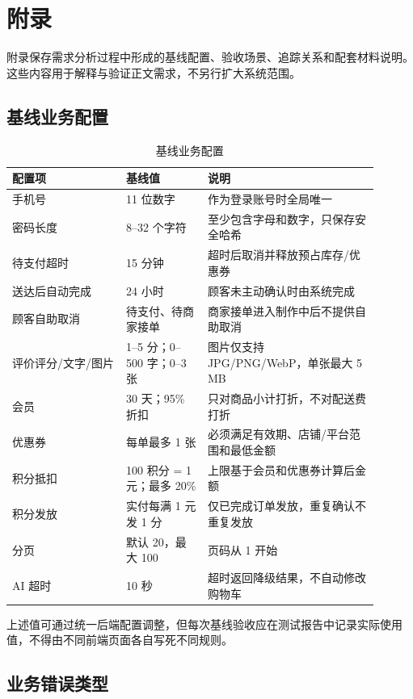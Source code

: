 \section{附录}

附录保存需求分析过程中形成的基线配置、验收场景、追踪关系和配套材料说明。这些内容用于解释与验证正文需求，不另行扩大系统范围。

\subsection{基线业务配置}

\begin{longtable}{|L{0.28\linewidth}|L{0.20\linewidth}|L{0.42\linewidth}|}
\caption{基线业务配置}\label{tab:baseline-config}\\ \hline
\textbf{配置项} & \textbf{基线值} & \textbf{说明} \\ \hline
手机号 & 11 位数字 & 作为登录账号时全局唯一 \\ \hline
密码长度 & 8--32 个字符 & 至少包含字母和数字，只保存安全哈希 \\ \hline
待支付超时 & 15 分钟 & 超时后取消并释放预占库存/优惠券 \\ \hline
送达后自动完成 & 24 小时 & 顾客未主动确认时由系统完成 \\ \hline
顾客自助取消 & 待支付、待商家接单 & 商家接单进入制作中后不提供自助取消 \\ \hline
评价评分/文字/图片 & 1--5 分；0--500 字；0--3 张 & 图片仅支持 JPG/PNG/WebP，单张最大 5 MB \\ \hline
会员 & 30 天；95\% 折扣 & 只对商品小计打折，不对配送费打折 \\ \hline
优惠券 & 每单最多 1 张 & 必须满足有效期、店铺/平台范围和最低金额 \\ \hline
积分抵扣 & 100 积分 = 1 元；最多 20\% & 上限基于会员和优惠券计算后金额 \\ \hline
积分发放 & 实付每满 1 元发 1 分 & 仅已完成订单发放，重复确认不重复发放 \\ \hline
分页 & 默认 20，最大 100 & 页码从 1 开始 \\ \hline
AI 超时 & 10 秒 & 超时返回降级结果，不自动修改购物车 \\ \hline
\end{longtable}

上述值可通过统一后端配置调整，但每次基线验收应在测试报告中记录实际使用值，不得由不同前端页面各自写死不同规则。

\subsection{业务错误类型}

